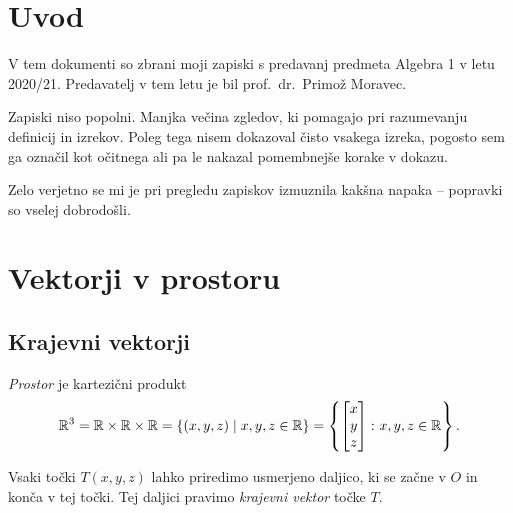 \documentclass[12pt, a4paper]{article}
\begin{document}
\renewcommand{\headheight}{20pt}
\renewcommand{\arraystretch}{1}

\maketitle

\newpage

\tableofcontents

\newpage

\section*{Uvod}

V tem dokumenti so zbrani moji zapiski s predavanj predmeta Algebra 1 v letu 2020/21. Predavatelj v tem letu je bil prof.~dr.~Primož Moravec.

Zapiski niso popolni. Manjka večina zgledov, ki pomagajo pri razumevanju definicij in izrekov. Poleg tega nisem dokazoval čisto vsakega izreka, pogosto sem ga označil kot očitnega ali pa le nakazal pomembnejše korake v dokazu.

Zelo verjetno se mi je pri pregledu zapiskov izmuznila kakšna napaka -- popravki so vselej dobrodošli.

\newpage

\section{Vektorji v prostoru}
\subsection{Krajevni vektorji}

\begin{okvir}
\begin{definicija}
\emph{Prostor} je kartezični produkt
\[
\mathbb{R}^3=\mathbb{R}\times\mathbb{R}\times\mathbb{R}
=\left\{(x, y, z)\mid x,y,z\in\mathbb{R}\right\}
=\left\{
\begin{bmatrix}
x \\
y \\
z
\end{bmatrix}
\colon x,y,z\in\mathbb{R}\right\}.
\]
\end{definicija}
\end{okvir}

Vsaki točki $T(x,y,z)$ lahko priredimo usmerjeno daljico, ki se začne v $O$ in konča v tej točki. Tej daljici pravimo \emph{krajevni vektor} točke $T$.
\end{document}
